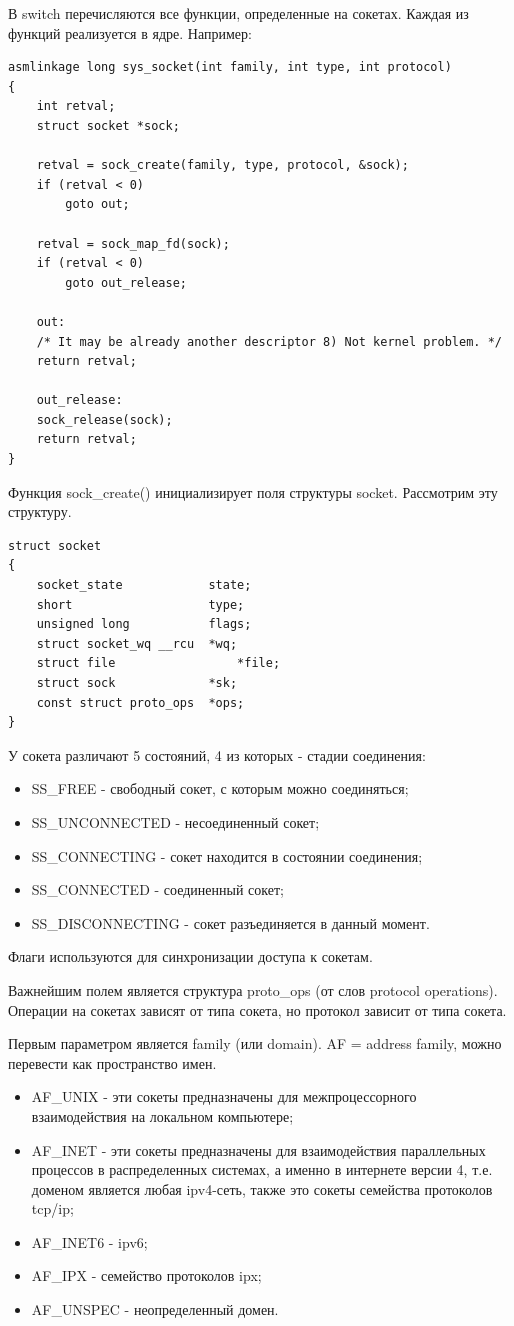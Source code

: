 \documentclass[12pt,a4paper]{scrreprt}
\begin{document}
В switch перечисляются все функции, определенные на сокетах. Каждая из функций реализуется в ядре. Например:

\begin{lstlisting}
asmlinkage long sys_socket(int family, int type, int protocol)
{
	int retval;
	struct socket *sock;
	
	retval = sock_create(family, type, protocol, &sock);
	if (retval < 0)
		goto out;
	
	retval = sock_map_fd(sock);
	if (retval < 0)
		goto out_release;
	
	out:
	/* It may be already another descriptor 8) Not kernel problem. */
	return retval;
	
	out_release:
	sock_release(sock);
	return retval;
}
\end{lstlisting}

Функция sock\_create() инициализирует поля структуры socket. Рассмотрим эту структуру.

\begin{lstlisting}
struct socket 
{
	socket_state            state;
	short                   type;
	unsigned long           flags;
	struct socket_wq __rcu  *wq;
	struct file       			*file;
	struct sock             *sk;
	const struct proto_ops  *ops;
}
\end{lstlisting}

У сокета различают 5 состояний, 4 из которых - стадии соединения:

\begin{itemize}
	\item SS\_FREE - свободный сокет, с которым можно соединяться;
	\item SS\_UNCONNECTED - несоединенный сокет;
	\item SS\_CONNECTING - сокет находится в состоянии соединения;
	\item SS\_CONNECTED - соединенный сокет;
	\item SS\_DISCONNECTING - сокет разъединяется в данный момент.
\end{itemize}

Флаги используются для синхронизации доступа к сокетам. 

Важнейшим полем является структура proto\_ops (от слов protocol operations). Операции на сокетах зависят от типа сокета, но протокол зависит от типа сокета.

Первым параметром является family (или domain). AF = address family, можно перевести как пространство имен.

\begin{itemize}
	\item AF\_UNIX - эти сокеты предназначены для межпроцессорного взаимодействия на локальном компьютере;
	\item AF\_INET - эти сокеты предназначены для взаимодействия параллельных процессов в распределенных системах, а именно в интернете версии 4, т.е. доменом является любая ipv4-сеть, также это сокеты семейства протоколов tcp/ip;
	\item AF\_INET6 - ipv6;
	\item AF\_IPX - семейство протоколов ipx;
	\item AF\_UNSPEC - неопределенный домен.
\end{itemize}
\end{document}
